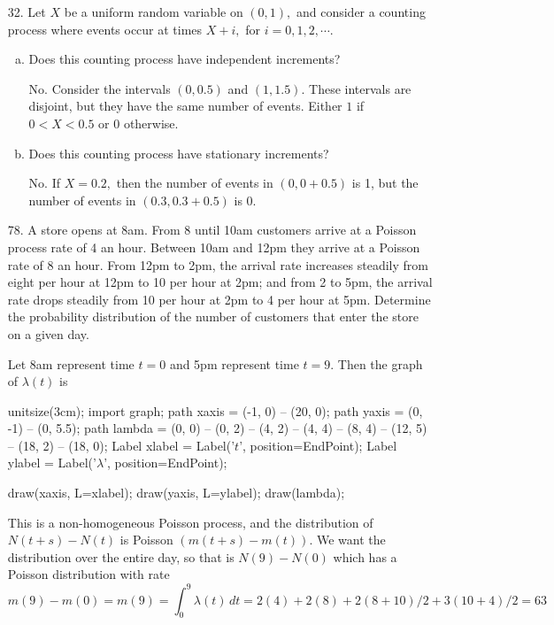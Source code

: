 \documentclass{article}
\begin{document}
\begin{itemize}
	\item[32.] Let $X$ be a uniform random variable on $(0, 1),$ and consider a counting process where events occur at times $X+i,$ for $i=0, 1, 2, \cdots.$ 
		\begin{enumerate}[(a)]
			\item Does this counting process have independent increments?
				\begin{answer*}
					No. Consider the intervals $(0, 0.5)$ and $(1, 1.5).$ These intervals are disjoint, but they have the same number of events. Either $1$ if $0<X<0.5$ or $0$ otherwise.
				\end{answer*}

				\newpage
			\item Does this counting process have stationary increments?
				\begin{answer*}
					No. If $X=0.2,$ then the number of events in $(0, 0+0.5)$ is 1, but the number of events in $(0.3, 0.3+0.5)$ is 0.
				\end{answer*}

		\end{enumerate}

	\item[78.] A store opens at 8am. From 8 until 10am customers arrive at a Poisson process rate of 4 an hour. Between 10am and 12pm they arrive at a Poisson rate of 8 an hour. From 12pm to 2pm, the arrival rate increases steadily from eight per hour at 12pm to 10 per hour at 2pm; and from 2 to 5pm, the arrival rate drops steadily from 10 per hour at 2pm to 4 per hour at 5pm. Determine the probability distribution of the number of customers that enter the store on a given day.
		\begin{soln}
			Let 8am represent time $t=0$ and 5pm represent time $t=9.$ Then the graph of $\lambda(t)$ is
			\begin{center}
				\begin{asy}
					unitsize(3cm);
					import graph;
					path xaxis = (-1, 0) -- (20, 0);
					path yaxis = (0, -1) -- (0, 5.5);
					path lambda = (0, 0) -- (0, 2) -- (4, 2) -- (4, 4) -- (8, 4) -- (12, 5) -- (18, 2) -- (18, 0);
					Label xlabel = Label('$t$', position=EndPoint);
					Label ylabel = Label('$\lambda$', position=EndPoint);

					draw(xaxis, L=xlabel);
					draw(yaxis, L=ylabel);
					draw(lambda);
				\end{asy}
			\end{center}
			This is a non-homogeneous Poisson process, and the distribution of $N(t+s)-N(t)$ is Poisson $(m(t+s)-m(t)).$ We want the distribution over the entire day, so that is $N(9)-N(0)$ which has a Poisson distribution with rate
			\[m(9)-m(0) = m(9) = \int_0^9 \lambda(t)\, dt = 2(4) + 2(8) + 2(8+10)/2 + 3(10+4)/2 = 63\]
		\end{soln}


\end{itemize}
\end{document}
